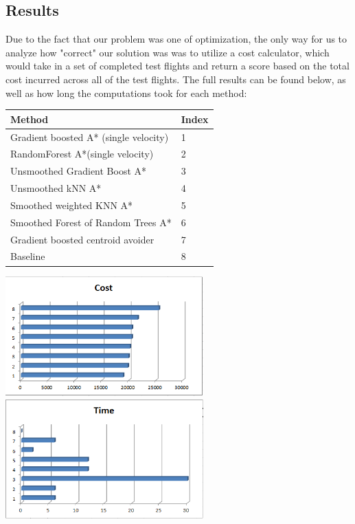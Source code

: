 \documentclass{article}[12pt]
\begin{document}
\begin{multicols}{2}
\subsection{Results}
Due to the fact that our problem was one of optimization, the only way for us to analyze how "correct" our solution was was to utilize a cost calculator, which would take in a set of completed test flights and return a score based on the total cost incurred across all of the test flights. The full results can be found below, as well as how long the computations took for each method: \\

\begingroup
\noindent
\begin{tabular}{ | l | l | }
    \hline
    Method & Index \\ \hline
    Gradient boosted A* (single velocity) & 1\\ \hline
		RandomForest A*(single velocity) & 2 \\ \hline
		Unsmoothed Gradient Boost A* & 3 \\ \hline
		Unsmoothed kNN A* & 4 \\ \hline
		Smoothed weighted KNN A* & 5 \\ \hline
		Smoothed Forest of Random Trees A* & 6 \\ \hline
		Gradient boosted centroid avoider & 7\\ \hline
		Baseline & 8 \\ \hline
\end{tabular}
\begin{center}
    \includegraphics[width=3in]{results.png}
		\includegraphics[width=3in]{time.png}
	\end{center}
\endgroup


\end{multicols}
\end{document}
